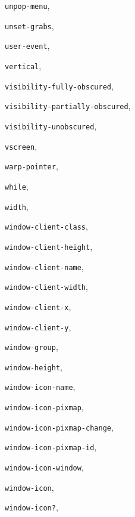 \begin{theindex}
\item {\tt unpop-menu}, {\bf\pageref{unpop-menu}}
\item {\tt unset-grabs}, {\bf\pageref{unset-grabs}}
\item {\tt user-event}, {\bf\pageref{user-event}}
\item {\tt vertical}, {\bf\pageref{vertical}}
\item {\tt visibility-fully-obscured}, {\bf\pageref{visibility-fully-obscured}}
\item {\tt visibility-partially-obscured}, {\bf\pageref{visibility-partially-obscured}}
\item {\tt visibility-unobscured}, {\bf\pageref{visibility-unobscured}}
\item {\tt vscreen}, {\bf\pageref{vscreen}}
\item {\tt warp-pointer}, {\bf\pageref{warp-pointer}}
\item {\tt while}, {\bf\pageref{while}}
\item {\tt width}, {\bf\pageref{width}}
\item {\tt window-client-class}, {\bf\pageref{window-client-class}}
\item {\tt window-client-height}, {\bf\pageref{window-client-height}}
\item {\tt window-client-name}, {\bf\pageref{window-client-name}}
\item {\tt window-client-width}, {\bf\pageref{window-client-width}}
\item {\tt window-client-x}, {\bf\pageref{window-client-x}}
\item {\tt window-client-y}, {\bf\pageref{window-client-y}}
\item {\tt window-group}, {\bf\pageref{window-group}}
\item {\tt window-height}, {\bf\pageref{window-height}}
\item {\tt window-icon-name}, {\bf\pageref{window-icon-name}}
\item {\tt window-icon-pixmap}, {\bf\pageref{window-icon-pixmap}}
\item {\tt window-icon-pixmap-change}, {\bf\pageref{window-icon-pixmap-change}}
\item {\tt window-icon-pixmap-id}, {\bf\pageref{window-icon-pixmap-id}}
\item {\tt window-icon-window}, {\bf\pageref{window-icon-window}}
\item {\tt window-icon}, {\bf\pageref{window-icon}}
\item {\tt window-icon?}, {\bf\pageref{window-icon?}}

\end{theindex}
